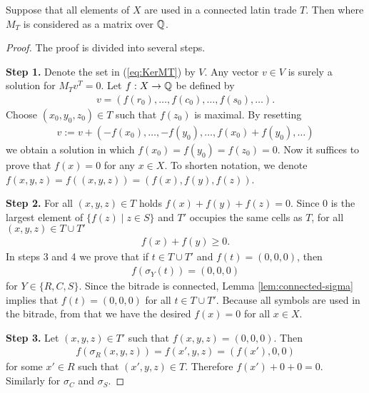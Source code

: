 \begin{lem}
Suppose that all elements of $X$ are used in a connected latin trade $T$. Then
%
where $M_T$ is considered as a matrix over $\mathbb Q$.
\end{lem}
\begin{proof}
The proof is divided into several steps.

%
%
\item \textbf{Step 1.}
Denote the set in (\ref{eq:KerMT}) by $V$. Any vector $v \in V$ is surely a solution for $M_Tv^T = 0$. Let $f:X \rightarrow \mathbb Q$ be defined by
\begin{align}
	v = (f(r_0), \dots, f(c_0), \dots, f(s_0), \dots).
\end{align}
Choose $(x_0, y_0, z_0) \in T$ such that $f(z_0)$ is maximal. By resetting
\begin{align}
	v := v+(-f(x_0), \dots, -f(y_0), \dots,f(x_0)+f(y_0), \dots)
\end{align}
we obtain a solution in which $f(x_0) = f(y_0) = f(z_0) = 0$. Now it suffices to prove that $f(x) = 0$ for any $x \in X$. To shorten notation, we denote $f(x,y,z) = f((x,y,z)) = (f(x),f(y),f(z))$.

%
%
\item \textbf{Step 2.}
For all $(x,y,z) \in T$ holds $f(x)+f(y)+f(z)=0$. Since $0$ is the largest element of $\{f(z) \mid z \in S\}$ and $T'$ occupies the same cells as $T$, for all $(x,y,z) \in T \cup T'$
\begin{align}
	f(x) + f(y) \geq 0.
\end{align}
In steps 3 and 4 we prove that if $t \in T\cup T'$ and $f(t) = (0,0,0)$, then
\begin{align}
	f(\sigma_Y(t)) = (0,0,0)
\end{align}
for $Y \in \{R, C, S\}$. Since the bitrade is connected, Lemma \ref{lem:connected-sigma} implies that $f(t) = (0,0,0)$ for all $t \in T \cup T'$. Because all symbols are used in the bitrade, from that we have the desired $f(x) = 0$ for all $x \in X$.

%
%
\item \textbf{Step 3.}
Let $(x,y,z) \in T'$ such that $f(x,y,z) = (0,0,0)$. Then
\begin{align}
	f(\sigma_R(x,y,z)) = f(x',y,z) = (f(x'), 0, 0)
\end{align}
for some $x' \in R$ such that $(x',y,z) \in T$. Therefore $f(x') + 0 + 0 = 0$. Similarly for $\sigma_C$ and $\sigma_S$.


\end{proof}
